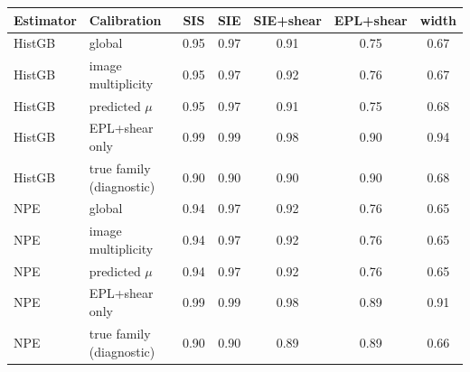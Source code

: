 \begin{tabular*}{\linewidth}{@{\extracolsep{\fill}}llccccc@{}}
\toprule
Estimator & Calibration & SIS & SIE & SIE+shear & EPL+shear & width \\
\midrule
HistGB & global & 0.95 & 0.97 & 0.91 & 0.75 & 0.67 \\
HistGB & image multiplicity & 0.95 & 0.97 & 0.92 & 0.76 & 0.67 \\
HistGB & predicted $\mu$ & 0.95 & 0.97 & 0.91 & 0.75 & 0.68 \\
HistGB & EPL+shear only & 0.99 & 0.99 & 0.98 & 0.90 & 0.94 \\
HistGB & true family (diagnostic) & 0.90 & 0.90 & 0.90 & 0.90 & 0.68 \\
\midrule
NPE & global & 0.94 & 0.97 & 0.92 & 0.76 & 0.65 \\
NPE & image multiplicity & 0.94 & 0.97 & 0.92 & 0.76 & 0.65 \\
NPE & predicted $\mu$ & 0.94 & 0.97 & 0.92 & 0.76 & 0.65 \\
NPE & EPL+shear only & 0.99 & 0.99 & 0.98 & 0.89 & 0.91 \\
NPE & true family (diagnostic) & 0.90 & 0.90 & 0.89 & 0.89 & 0.66 \\
\bottomrule
\end{tabular*}